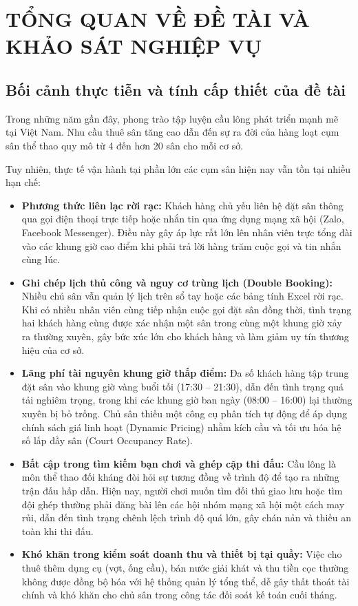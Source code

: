 
\chapter{TỔNG QUAN VỀ ĐỀ TÀI VÀ KHẢO SÁT NGHIỆP VỤ}
\label{chap:tongquan}

\section{Bối cảnh thực tiễn và tính cấp thiết của đề tài}
\label{sec:boicanh}

Trong những năm gần đây, phong trào tập luyện cầu lông phát triển mạnh mẽ tại Việt Nam. Nhu cầu thuê sân tăng cao dẫn đến sự ra đời của hàng loạt cụm sân thể thao quy mô từ 4 đến hơn 20 sân cho mỗi cơ sở.

Tuy nhiên, thực tế vận hành tại phần lớn các cụm sân hiện nay vẫn tồn tại nhiều hạn chế:
\begin{itemize}[leftmargin=1.5cm]
    \item \textbf{Phương thức liên lạc rời rạc:} Khách hàng chủ yếu liên hệ đặt sân thông qua gọi điện thoại trực tiếp hoặc nhắn tin qua ứng dụng mạng xã hội (Zalo, Facebook Messenger). Điều này gây áp lực rất lớn lên nhân viên trực tổng đài vào các khung giờ cao điểm khi phải trả lời hàng trăm cuộc gọi và tin nhắn cùng lúc.
    \item \textbf{Ghi chép lịch thủ công và nguy cơ trùng lịch (Double Booking):} Nhiều chủ sân vẫn quản lý lịch trên sổ tay hoặc các bảng tính Excel rời rạc. Khi có nhiều nhân viên cùng tiếp nhận cuộc gọi đặt sân đồng thời, tình trạng hai khách hàng cùng được xác nhận một sân trong cùng một khung giờ xảy ra thường xuyên, gây bức xúc lớn cho khách hàng và làm giảm uy tín thương hiệu của cơ sở.
    \item \textbf{Lãng phí tài nguyên khung giờ thấp điểm:} Đa số khách hàng tập trung đặt sân vào khung giờ vàng buổi tối (17:30 -- 21:30), dẫn đến tình trạng quá tải nghiêm trọng, trong khi các khung giờ ban ngày (08:00 -- 16:00) lại thường xuyên bị bỏ trống. Chủ sân thiếu một công cụ phân tích tự động để áp dụng chính sách giá linh hoạt (Dynamic Pricing) nhằm kích cầu và tối ưu hóa hệ số lấp đầy sân (Court Occupancy Rate).
    \item \textbf{Bất cập trong tìm kiếm bạn chơi và ghép cặp thi đấu:} Cầu lông là môn thể thao đối kháng đòi hỏi sự tương đồng về trình độ để tạo ra những trận đấu hấp dẫn. Hiện nay, người chơi muốn tìm đối thủ giao lưu hoặc tìm đội ghép thường phải đăng bài lên các hội nhóm mạng xã hội một cách may rủi, dẫn đến tình trạng chênh lệch trình độ quá lớn, gây chán nản và thiếu an toàn khi thi đấu.
    \item \textbf{Khó khăn trong kiểm soát doanh thu và thiết bị tại quầy:} Việc cho thuê thêm dụng cụ (vợt, ống cầu), bán nước giải khát và thu tiền cọc thường không được đồng bộ hóa với hệ thống quản lý tổng thể, dễ gây thất thoát tài chính và khó khăn cho chủ sân trong công tác đối soát kế toán cuối tháng.
\end{itemize}

